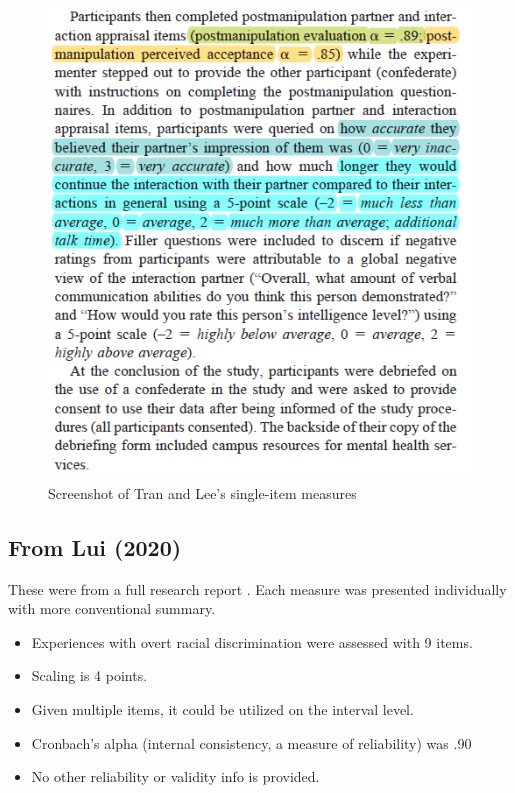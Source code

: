 \documentclass[
  english,
]{book}
\providecommand{\tightlist}{%
  \setlength{\itemsep}{0pt}\setlength{\parskip}{0pt}}
\begin{document}
\begin{figure}
\centering
\includegraphics{images/PsychoM/TranLee2.png}
\caption{Screenshot of Tran and Lee's single-item measures}
\end{figure}

\hypertarget{from-lui-2020}{%
\subsection{From Lui (2020)}\label{from-lui-2020}}

These were from a full research report \citep{lui_racial_2020}. Each measure was presented individually with more conventional summary.

\begin{itemize}
\tightlist
\item
  Experiences with overt racial discrimination were assessed with 9 items.
\item
  Scaling is 4 points.
\item
  Given multiple items, it could be utilized on the interval level.
\item
  Cronbach's alpha (internal consistency, a measure of reliability) was .90
\item
  No other reliability or validity info is provided.
\end{itemize}
\end{document}
